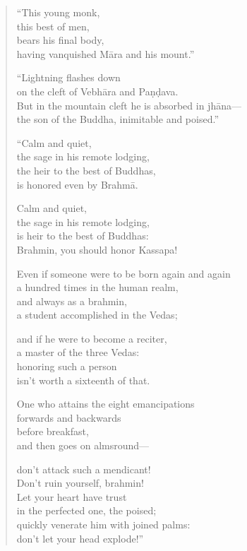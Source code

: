 \documentclass[12pt,openany]{book}%
\begin{document}
\begin{verse}
“This young monk, \\
this best of men, \\
bears his final body, \\
having vanquished \textsanskrit{Māra} and his mount.” 

“Lightning flashes down \\
on the cleft of \textsanskrit{Vebhāra} and \textsanskrit{Paṇḍava}. \\
But in the mountain cleft he is absorbed in \textsanskrit{jhāna}—\\
the son of the Buddha, inimitable and poised.” 

“Calm and quiet, \\
the sage in his remote lodging, \\
the heir to the best of Buddhas, \\
is honored even by \textsanskrit{Brahmā}. 

Calm and quiet, \\
the sage in his remote lodging, \\
is heir to the best of Buddhas: \\
Brahmin, you should honor Kassapa! 

Even if someone were to be born again and again \\
a hundred times in the human realm, \\
and always as a brahmin, \\
a student accomplished in the Vedas; 

and if he were to become a reciter, \\
a master of the three Vedas: \\
honoring such a person \\
isn’t worth a sixteenth of that. 

One who attains the eight emancipations \\
forwards and backwards \\
before breakfast, \\
and then goes on almsround—

don’t attack such a mendicant! \\
Don’t ruin yourself, brahmin! \\
Let your heart have trust \\
in the perfected one, the poised; \\
quickly venerate him with joined palms: \\
don’t let your head explode!” 


\end{verse}
\end{document}
